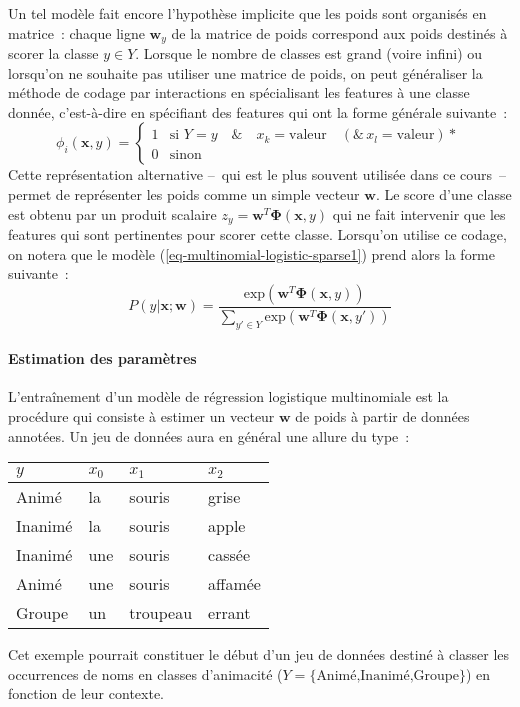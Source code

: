 \documentclass[11pt,openany]{book}
\begin{document}
Un tel modèle fait encore l'hypothèse implicite que les poids sont
organisés en matrice~: chaque ligne $\mathbf{w}_y$ de la matrice de
poids correspond aux poids destinés à scorer la classe $y\in Y$. 
Lorsque le nombre de classes est grand (voire infini) ou lorsqu'on ne
souhaite pas utiliser une matrice de poids, on peut généraliser la méthode
de codage par interactions en spécialisant les features à une classe
donnée, c'est-à-dire en spécifiant des features qui ont la forme générale suivante~:
\begin{displaymath}
\phi_i(\mathbf{x}, y) = 
\left\{
\begin{array}{ll}
1&\text{si } Y=y \quad\&\quad  x_k = \text{valeur}\quad (\&\, x_l = \text{valeur})*\\
0&\text{sinon}
\end{array}
\right.
\end{displaymath}
Cette représentation alternative --~qui est le plus souvent utilisée dans
ce cours~-- permet de représenter les poids comme un simple vecteur
$\mathbf{w}$. Le score d'une classe est obtenu par un produit scalaire 
$z_y = \mathbf{w}^T\boldsymbol\Phi(\mathbf{x},y)$ qui ne fait intervenir
que les features qui sont pertinentes pour scorer cette classe.
Lorsqu'on utilise ce codage, on notera que le modèle (\ref{eq-multinomial-logistic-sparse1}) 
prend alors la forme suivante~:
\begin{equation}
\label{eq-multinomial-logistic-sparse2}
P(y|\mathbf{x};\mathbf{w}) =  \frac{\text{exp}(\mathbf{w}^T
    \boldsymbol\Phi(\mathbf{x},y)) }{\sum_{y'\in Y} \text{exp}(\mathbf{w}^T
   \boldsymbol\Phi( \mathbf{x},y'))}
\end{equation}


\paragraph{Estimation des paramètres} L'entraînement d'un modèle de
régression logistique multinomiale est la procédure qui consiste à
estimer un vecteur $\mathbf{w}$ de poids à partir  de  données annotées.
Un jeu de données aura en général une allure du type~:
\begin{center}
\begin{tabular}{llll}\toprule
$y$ &$x_0$&$x_1$&$x_2$\\\midrule
Animé&la&	souris&	grise\\
Inanimé&	la&	souris&	apple\\
Inanimé&	une&	souris&	cassée\\
Animé&	une&	souris&	affamée\\
Groupe	&un&	troupeau&	errant\\\bottomrule
\end{tabular}
\end{center}
Cet exemple pourrait constituer le début d'un jeu de données destiné à
classer les occurrences de noms en classes d'animacité ($Y = \{\text{Animé,Inanimé,Groupe}\}$)
en fonction de leur contexte. 
\end{document}
